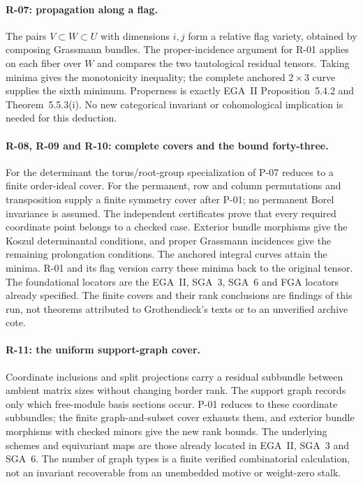 \paragraph{R-07: propagation along a flag.}
The pairs $V\subset W\subset U$ with dimensions $i,j$
form a relative flag variety, obtained by composing
Grassmann bundles. The proper-incidence argument for
R-01 applies on each fiber over $W$ and compares the
two tautological residual tensors. Taking minima gives
the monotonicity inequality; the complete anchored
$2\times3$ curve supplies the sixth minimum. Properness
is exactly EGA~II Proposition~5.4.2 and
Theorem~5.5.3(i). No new categorical invariant or
cohomological implication is needed for this deduction.

\paragraph{R-08, R-09 and R-10: complete covers and the bound forty-three.}
For the determinant the torus/root-group specialization of
P-07 reduces to a finite order-ideal cover. For the permanent,
row and column permutations and transposition supply a finite
symmetry cover after P-01; no permanent Borel invariance is
assumed. The independent certificates prove that every required
coordinate point belongs to a checked case. Exterior bundle
morphisms give the Koszul determinantal conditions, and proper
Grassmann incidences give the remaining prolongation conditions.
The anchored integral curves attain the minima. R-01 and its
flag version carry these minima back to the original tensor.
The foundational locators are the EGA~II, SGA~3, SGA~6 and FGA
locators already specified. The finite covers and their rank
conclusions are findings of this run, not theorems attributed
to Grothendieck's texts or to an unverified archive cote.

\paragraph{R-11: the uniform support-graph cover.}
Coordinate inclusions and split projections carry a residual
subbundle between ambient matrix sizes without changing border
rank. The support graph records only which free-module basis
sections occur. P-01 reduces to these coordinate subbundles;
the finite graph-and-subset cover exhausts them, and exterior
bundle morphisms with checked minors give the new rank bounds.
The underlying schemes and equivariant maps are those already
located in EGA~II, SGA~3 and SGA~6. The number of graph types is
a finite verified combinatorial calculation, not an invariant
recoverable from an unembedded motive or weight-zero stalk.

